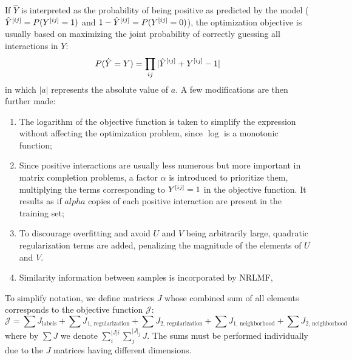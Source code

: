 \begin{apendicesenv}
If $\hat Y$ is interpreted as the probability of being positive as predicted by the model ($\hat Y^{[ij]} = P(Y^{[ij]} = 1)$ and $1-\hat Y^{[ij]} = P(Y^{[ij]} = 0)$),
the optimization objective is usually based on maximizing the joint probability of correctly guessing all interactions in $Y$:
%
\begin{equation}
    P(\hat Y = Y) = \prod_{ij} | \hat Y^{[ij]} + Y^{[ij]} - 1|
    \label{eq:lmf_objective_raw}
\end{equation}
%
in which $|a|$ represents the absolute value of $a$. A few modifications are then further made:
%
\begin{enumerate}
    \item The logarithm of the objective function is taken to simplify the expression without affecting the optimization problem, since $\log$ is a monotonic function;
    \item Since positive interactions are usually less numerous but more important in matrix completion problems, a factor $\alpha$ is introduced to prioritize them, multiplying the terms corresponding to $Y^{[ij]}=1$ in the objective function. It results as if $alpha$ copies of each positive interaction are present in the training set;
    \item To discourage overfitting and avoid $U$ and $V$ being arbitrarily large, quadratic regularization terms are added, penalizing the magnitude of the elements of $U$ and $V$.
    \item Similarity information between samples is incorporated by NRLMF,%
\end{enumerate}
%
To simplify notation, we define matrices $J$ whose combined sum of all elements corresponds to the objective function $\mathcal{J}$:
%
\begin{equation}
    \mathcal{J} =
        \sum J_\text{labels}
        + \sum J_\text{1, regularization}
        + \sum J_\text{2, regularization}
        + \sum J_\text{1, neighborhood}
        + \sum J_\text{2, neighborhood}
    \label{eq:lmf_objective_matrices}
\end{equation}
%
where by $\sum J$ we denote $\sum_i^{|J|i}\sum_j^{|J|_j} J$. The sums must be performed individually due to the $J$ matrices having different dimensions.


\end{apendicesenv}
